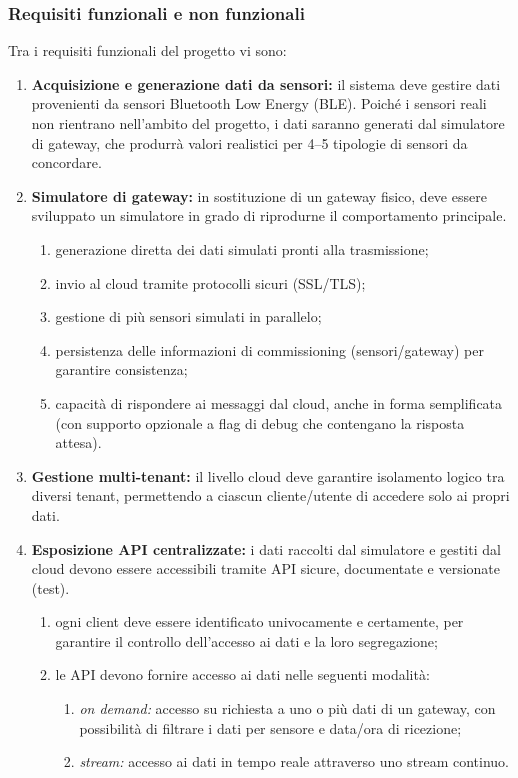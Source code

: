 \documentclass[a4paper,11pt]{article}
\begin{document}
\subsubsection{Requisiti funzionali e non funzionali}
Tra i requisiti funzionali del progetto vi sono:
\begin{enumerate}[noitemsep, topsep=0pt]
  \item \textbf{Acquisizione e generazione dati da sensori:} il sistema deve gestire dati provenienti da sensori Bluetooth Low Energy (BLE). Poiché i sensori reali non rientrano nell'ambito del progetto, i dati saranno generati dal simulatore di gateway, che produrrà valori realistici per 4--5 tipologie di sensori da concordare.

  \item \textbf{Simulatore di gateway:} in sostituzione di un gateway fisico, deve essere sviluppato un simulatore 
  in grado di riprodurne il comportamento principale.
  \begin{enumerate}
    \item generazione diretta dei dati simulati pronti alla trasmissione;
    \item invio al cloud tramite protocolli sicuri (SSL/TLS);
    \item gestione di più sensori simulati in parallelo;
    \item persistenza delle informazioni di commissioning (sensori/gateway) per garantire consistenza;
    \item capacità di rispondere ai messaggi dal cloud, anche in forma semplificata 
    (con supporto opzionale a flag di debug che contengano la risposta attesa).
  \end{enumerate}

  \item \textbf{Gestione multi-tenant:} il livello cloud deve garantire isolamento logico tra diversi tenant, 
  permettendo a ciascun cliente/utente di accedere solo ai propri dati.

  \item \textbf{Esposizione API centralizzate:} i dati raccolti dal simulatore e gestiti dal cloud devono essere accessibili 
  tramite API sicure, documentate e versionate (test).
  \begin{enumerate}
    \item ogni client deve essere identificato univocamente e certamente, per garantire il controllo 
    dell’accesso ai dati e la loro segregazione;
    \item le API devono fornire accesso ai dati nelle seguenti modalità:
    \begin{enumerate}
      \item \textit{on demand:} accesso su richiesta a uno o più dati di un gateway, 
      con possibilità di filtrare i dati per sensore e data/ora di ricezione;
      \item \textit{stream:} accesso ai dati in tempo reale attraverso uno stream continuo.
    \end{enumerate}
  \end{enumerate}


\end{enumerate}
\end{document}
